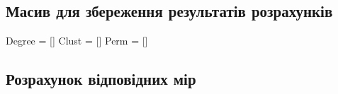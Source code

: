 \documentclass[
  letterpaper,
]{report}
\newenvironment{Shaded}{\begin{snugshade}}{\end{snugshade}}
\newcommand{\NormalTok}[1]{\textcolor[rgb]{0.00,0.23,0.31}{#1}}
\newcommand{\OperatorTok}[1]{\textcolor[rgb]{0.37,0.37,0.37}{#1}}
\begin{document}
\hypertarget{ux43cux430ux441ux438ux432-ux434ux43bux44f-ux437ux431ux435ux440ux435ux436ux435ux43dux43dux44f-ux440ux435ux437ux443ux43bux44cux442ux430ux442ux456ux432-ux440ux43eux437ux440ux430ux445ux443ux43dux43aux456ux432}{%
\subsection{Масив для збереження результатів
розрахунків}\label{ux43cux430ux441ux438ux432-ux434ux43bux44f-ux437ux431ux435ux440ux435ux436ux435ux43dux43dux44f-ux440ux435ux437ux443ux43bux44cux442ux430ux442ux456ux432-ux440ux43eux437ux440ux430ux445ux443ux43dux43aux456ux432}}

\begin{Shaded}
\begin{Highlighting}[]
\NormalTok{Degree }\OperatorTok{=}\NormalTok{ []}
\NormalTok{Clust }\OperatorTok{=}\NormalTok{ []}
\NormalTok{Perm }\OperatorTok{=}\NormalTok{ []}
\end{Highlighting}
\end{Shaded}

\hypertarget{ux440ux43eux437ux440ux430ux445ux443ux43dux43eux43a-ux432ux456ux434ux43fux43eux432ux456ux434ux43dux438ux445-ux43cux456ux440-1}{%
\subsection{Розрахунок відповідних
мір}\label{ux440ux43eux437ux440ux430ux445ux443ux43dux43eux43a-ux432ux456ux434ux43fux43eux432ux456ux434ux43dux438ux445-ux43cux456ux440-1}}
\end{document}
